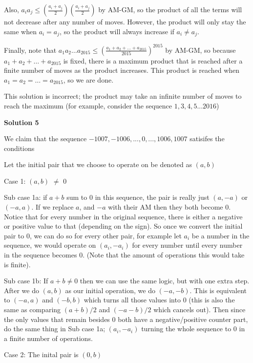 \begin{enumerate}
 Also, $a_ia_j \le (\frac{a_i+a_j}{2})(\frac{a_i+a_j}{2})$ by AM-GM, so the product of all the terms will not decrease after any number of moves. However, the product will only stay the same when $a_i=a_j$, so the product will always increase if $a_i\ne a_j$.

 Finally, note that $a_1a_2\dots a_{2015}\le (\frac{a_1+a_2+\dots +a_{2015}}{2015})^{2015}$ by AM-GM, so because $a_1+a_2+\dots +a_{2015}$ is fixed, there is a maximum product that is reached after a finite number of moves as the product increases. This product is reached when $a_1=a_2=\dots =a_{2015}$, so we are done.

 This solution is incorrect; the product may take an infinite number of moves to reach the maximum (for example, consider the sequence $1, 3, 4, 5... 2016$)

 



\textbf{Solution 5}

We claim that the sequence $-1007, -1006, ... ,0, ... , 1006, 1007$ satisifes the conditions

 Let the initial pair that we choose to operate on be denoted as $(a, b)$

 Case 1: $(a, b)$ $\neq$ $0$

 Sub case 1a: if $a + b$ sum to $0$ in this sequence, the pair is really just $(a, -a)$ or $(-a, a)$. If we replace $a$, and $-a$ with their AM then they both become $0$. Notice that for every number in the original sequence, there is either a negative or positive value to that (depending on the sign). So once we convert the initial pair to $0$, we can do so for every other pair, for example let $a_i$ be a number in the sequence, we would operate on $(a_i, -a_i)$ for every number until every number in the sequence becomes $0$. (Note that the amount of operations this would take is finite). 

 Sub case 1b: If $a + b \neq 0$ then we can use the same logic, but with one extra step. After we do $(a, b)$ as our initial operation, we do $(-a, -b)$. This is equivalent to $(-a, a)$ and $(-b, b)$ which turns all those values into $0$ (this is also the same as comparing $(a+b)/2$ and $(-a-b)/2$ which cancels out). Then since the only values that remain besides $0$ both have a negative/positive counter part, do the same thing in Sub case 1a; $(a_i, -a_i)$ turning the whole sequence to $0$ in a finite number of operations. 

 Case 2: The inital pair is $(0, b)$


\end{enumerate}
